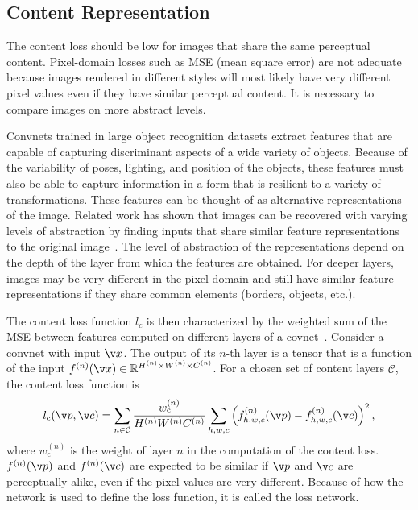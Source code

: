 \subsection{Content Representation}\label{sec:content}
The content loss should be low for images that share the same perceptual content. Pixel-domain losses such as MSE (mean square error) are not adequate because images rendered in different styles will most likely have very different pixel values even if they have similar perceptual content. It is necessary to compare images on more abstract levels.

Convnets trained in large object recognition datasets extract features that are capable of capturing discriminant aspects of a wide variety of objects. Because of the variability of poses, lighting, and position of the objects, these features must also be able to capture information in a form that is resilient to a variety of transformations. These features can be thought of as alternative representations of the image. Related work has shown that images can be recovered with varying levels of abstraction by finding inputs that share similar feature representations to the original image~\cite{mahendran2015understanding, yosinski2015understanding}. The level of abstraction of the representations depend on the depth of the layer from which the features are obtained. For deeper layers, images may be very different in the pixel domain and still have similar feature representations if they share common elements (borders, objects, etc.).

The content loss function $l_c$ is then characterized by the weighted sum of the MSE between features computed on different layers of a covnet~\cite{gatys2016image}. Consider a convnet with input $\v x$. The output of its $n$-th layer is a tensor that is a function of the input $f^{(n)}(\v x) \in \mathbb{R}^{H^{(n)}\times W^{(n)}\times C^{(n)}}$. For a chosen set of content layers $\mathcal{C}$, the content loss function is
\begin{equation}
l_\text{c}(\v p, \v c) = \sum_{n \in \mathcal{C}}\frac{w^{(n)}_\text{c}}{H^{(n)}W^{(n)}C^{(n)}}\sum_{h,w,c}\left(f_{h,w,c}^{(n)} (\v p) - f_{h,w,c}^{(n)}(\v c)\right)^2,
\end{equation}
where $w^{(n)}_\text{c}$ is the weight of layer $n$ in the computation of the content loss. $f^{(n)}(\v p)$ and $f^{(n)}(\v c)$ are expected to be similar if $\v p$ and $\v c$ are perceptually alike, even if the pixel values are very different. Because of how the network is used to define the loss function, it is called the loss network.

